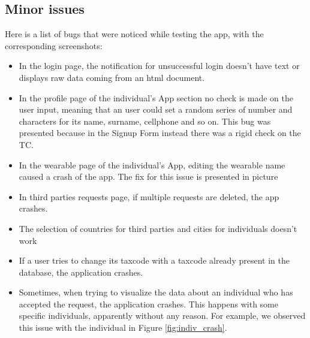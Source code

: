 \subsection{Minor issues}
Here is a list of bugs that were noticed while testing the app, with the corresponding screenshots:
\begin{itemize}
\item[] In the login page, the notification for unsuccessful login doesn't have text or displays raw data coming from an html document.
\item[] In the profile page of the individual's App section no check is made on the user input, meaning that an user could set a random series of number and characters for its name, surname, cellphone and so on. This bug was presented because in the Signup Form instead there was a rigid check on the TC.
\item[] In the wearable page of the individual's App, editing the wearable name caused a crash of the app. The fix for this issue is presented in picture
\item[] In third parties requests page, if multiple requests are deleted, the app crashes.
\item[] The selection of countries for third parties and cities for individuals doesn't work
\item[] If a user tries to change its taxcode with a taxcode already present in the database, the application  crashes.
\item[] Sometimes, when trying to visualize the data about an individual who has accepted the request, the application crashes. This happens with some specific individuals, apparently without any reason. For example, we observed this issue with the individual in Figure \ref{fig:indiv_crash}.
\end{itemize}


